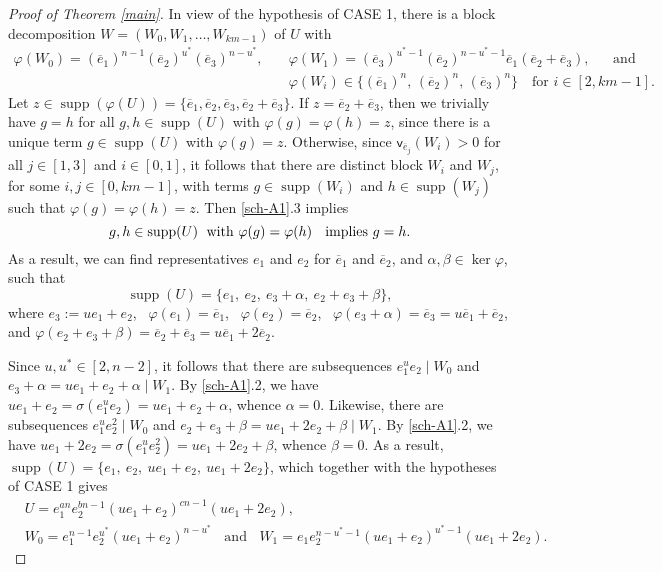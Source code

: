 \documentclass[11pt]{amsart}
\theoremstyle{definition}
\DeclareMathOperator{\supp}{supp}
\newcommand{\und}{\;\mbox{ and }\;}
\newcommand{\nn}{\nonumber}
\newcommand{\vp}{\mathsf v}
\numberwithin{equation}{section}
\begin{document}
\begin{proof}[Proof of Theorem \ref{main}]
	
	In view of the hypothesis of CASE 1, there is a block decomposition $W=(W_0,W_1,\ldots, W_{km-1})$ of $U$ with  \begin{align*} \varphi(W_0)=(\overline e_1)^{n-1} (\overline e_2)^{u^*} (\overline e_3)^{n-u^*},\quad
		&\varphi(W_1)=(\overline e_3)^{u^*-1} (\overline e_2)^{n-u^*-1} \overline e_1 (\overline e_2+\overline e_3),\quad \und\\
		&\varphi(W_i)\in \{(\overline e_1)^{n},\,(\overline e_2)^{n},\, (\overline e_3)^{n}\} \quad\mbox {for $i\in [2,km-1]$}.\end{align*}
	Let $z\in \supp(\varphi(U))=\{\overline e_1,\overline e_2,\overline e_3, \overline e_2+\overline e_3\}$. If $z=\overline e_2+\overline e_3$, then we trivially have $g=h$ for all $g,h\in\supp(U)$ with $\varphi(g)=\varphi(h)=z$, since there is a unique term $g\in \supp(U)$ with $\varphi(g)=z$. Otherwise, since
	$\vp_{\overline e_j}(W_i)>0$ for all $j\in[1,3]$ and $i\in [0,1]$, it follows
	that there are distinct block $W_i$ and $W_j$, for some $i,j\in [0,km-1]$, with terms $g\in \supp(W_i)$ and $h\in \supp(W_j)$ such that $\varphi(g)=\varphi(h)=z$. Then \ref{sch-A1}.3 implies 
	$$g,h\in \supp(U)\; \mbox{ with $\varphi(g)=\varphi(h)$ \; implies $g=h$}.$$
	As a result, we can find representatives $e_1$ and $e_2$ for $\overline e_1$ and $\overline e_2$, and $\alpha,\beta\in \ker\varphi$, such that
	$$\supp(U)=\{e_1, \ e_2, \ e_3+\alpha, \ e_2+e_3+\beta\},$$
	where $e_3:= ue_1+e_2$, \ $\varphi(e_1)=\overline e_1$, \ $\varphi(e_2)=\overline e_2$, \ $\varphi(e_3+\alpha)=\overline e_3=u\overline e_1+\overline e_2$, and $\varphi(e_2+e_3+\beta)=\overline e_2+\overline e_3=u\overline e_1+2\overline e_2$.
	
	Since $u,u^*\in [2,n-2]$, it follows that there are subsequences $e_1^u e_2\mid W_0$ and $e_3+\alpha=ue_1+e_2+\alpha\mid W_1$. By \ref{sch-A1}.2, we have $ue_1+e_2=\sigma(e_1^u e_2)=ue_1+e_2+\alpha$, whence $\alpha=0$. Likewise, there are subsequences $e_1^u e_2^2\mid W_0$ and $e_2+e_3+\beta=ue_1+2e_2+\beta\mid W_1$. By \ref{sch-A1}.2, we have $ue_1+2e_2=\sigma(e_1^u e_2^2)=ue_1+2e_2+\beta$, whence $\beta=0$. As a result, $\supp(U)=\{e_1, \ e_2, \ ue_1+e_2, \ ue_1+2e_2\}$, which together with the hypotheses of CASE 1 gives
	\begin{align}\label{U-go}&U=e_1^{an} e_2^{bn-1} (ue_1+e_2)^{cn-1} (ue_1+2e_2),\\
		&W_0=e_1^{n-1} e_2^{u^*} (ue_1+e_2)^{n-u^*}\;\und\; W_1=e_1 e_2^{n-u^*-1} (ue_1+e_2)^{u^*-1} (ue_1+2e_2).\nn
	\end{align}
	

\end{proof}
\end{document}
